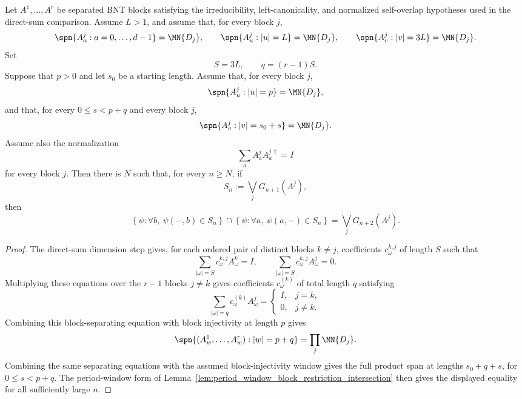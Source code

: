 \begin{lemma}
    \label{lem:bnt_direct_sum_block_separation_period_window_block_intersection}
    \leanok
    Let $A^1,\ldots,A^r$ be separated BNT blocks satisfying the
    irreducibility, left-canonicality, and normalized self-overlap hypotheses
    used in the direct-sum comparison. Assume $L>1$, and assume that, for
    every block $j$,
    \[
        \spn\{A^j_a:a=0,\ldots,d-1\}=\MN{D_j},
        \qquad
        \spn\{A^j_u:|u|=L\}=\MN{D_j},
        \qquad
        \spn\{A^j_v:|v|=3L\}=\MN{D_j}.
    \]
    Set
    \[
        S=3L,
        \qquad
        q=(r-1)S.
    \]
    Suppose that $p>0$ and let $s_0$ be a starting length. Assume that, for
    every block $j$,
    \[
        \spn\{A^j_u:|u|=p\}=\MN{D_j},
    \]
    and that, for every $0\le s<p+q$ and every block $j$,
    \[
        \spn\{A^j_v:|v|=s_0+s\}=\MN{D_j}.
    \]
    Assume also the normalization
    \[
        \sum_a A^j_aA^{j\,\dagger}_a=I
    \]
    for every block $j$. Then there is $N$ such that, for every $n\ge N$,
    if
    \[
        S_n:=\bigvee_jG_{n+1}(A^j),
    \]
    then
    \[
        \left\{\psi:\forall b,\ \psi(-,b)\in S_n\right\}
        \cap
        \left\{\psi:\forall a,\ \psi(a,-)\in S_n\right\}
        =
        \bigvee_jG_{n+2}(A^j).
    \]
\end{lemma}

\begin{proof}
    \leanok
    The direct-sum dimension step gives, for each ordered pair of distinct
    blocks $k\ne j$, coefficients $c^{k,j}_\omega$ of length $S$ such
    that
    \[
        \sum_{|\omega|=S} c^{k,j}_\omega A^k_\omega=I,
        \qquad
        \sum_{|\omega|=S} c^{k,j}_\omega A^j_\omega=0.
    \]
    Multiplying these equations over the $r-1$ blocks $j\ne k$ gives
    coefficients $c^{(k)}_\omega$ of total length $q$ satisfying
    \[
        \sum_{|\omega|=q}c^{(k)}_\omega A^j_\omega
        =
        \begin{cases}
            I, & j=k, \\
            0, & j\ne k.
        \end{cases}
    \]
    Combining this block-separating equation with block injectivity at length
    $p$ gives
    \[
        \spn\{(A^1_w,\ldots,A^r_w):|w|=p+q\}
        =
        \prod_j \MN{D_j}.
    \]
    Combining the same separating equations with the assumed
    block-injectivity window gives the full product span at lengths
    $s_0+q+s$, for $0\le s<p+q$. The period-window form of
    Lemma~\ref{lem:period_window_block_restriction_intersection} then gives
    the displayed equality for all sufficiently large $n$.
\end{proof}

